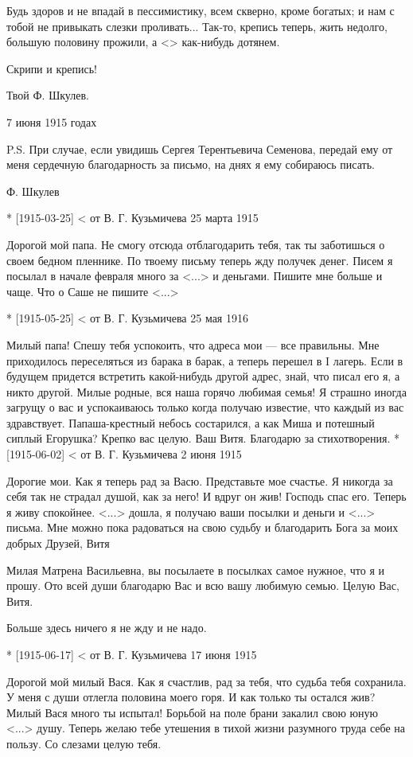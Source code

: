 Будь здоров и не впадай в пессимистику, всем скверно, кроме богатых; и нам с тобой не привыкать слезки проливать... Так-то, крепись теперь, жить недолго, большую половину прожили, а <> как-нибудь дотянем.

Скрипи и крепись!

Твой Ф. Шкулев.

7 июня 1915 годах

P.S. При случае, если увидишь Сергея Терентьевича Семенова, передай ему от меня сердечную благодарность за письмо, на днях я ему собираюсь писать.

Ф. Шкулев

* [1915-03-25] < от В. Г. Кузьмичева 
25 марта 1915

Дорогой мой папа. Не смогу отсюда отблагодарить тебя, так ты заботишься о своем бедном пленнике. По твоему письму теперь жду получек денег. Писем я посылал в начале февраля много за <...> и деньгами. Пишите мне больше и чаще. Что о Саше не пишите <...>

* [1915-05-25] < от В. Г. Кузьмичева 
25 мая 1916

Милый папа! Спешу тебя успокоить, что адреса мои — все правильны. Мне приходилось переселяться из барака в барак, а теперь перешел в I лагерь. Если в будущем придется встретить какой-нибудь другой адрес, знай, что писал его я, а никто другой. Милые родные, вся наша горячо любимая семья! Я страшно иногда загрущу о вас и успокаиваюсь только когда получаю известие, что каждый из вас здравствует. Папаша-крестный небось состарился, а как Миша и потешный сиплый Егорушка? Крепко вас целую. Ваш Витя. Благодарю за стихотворения.
* [1915-06-02] < от В. Г. Кузьмичева 
2 июня 1915

Дорогие мои. Как я теперь рад за Васю. Представьте мое счастье. Я никогда за себя так не страдал душой, как за него! И вдруг он жив! Господь спас его. Теперь я живу спокойнее. <...> дошла, я получаю ваши посылки и деньги и <...> письма. Мне можно пока радоваться на свою судьбу и благодарить Бога за моих добрых Друзей, Витя

Милая Матрена Васильевна, вы посылаете в посылках самое нужное, что я и прошу. Ото всей души благодарю Вас и всю вашу любимую семью. Целую Вас, Витя.

Больше здесь ничего я не жду и не надо.

* [1915-06-17] < от В. Г. Кузьмичева 
17 июня 1915

Дорогой мой милый Вася. Как я счастлив, рад за тебя, что судьба тебя сохранила. У меня с души отлегла половина моего горя. И как только ты остался жив? Милый Вася много ты испытал! Борьбой на поле брани закалил свою юную <...> душу. Теперь желаю тебе утешения в тихой жизни разумного труда себе на пользу. Со слезами целую тебя.

